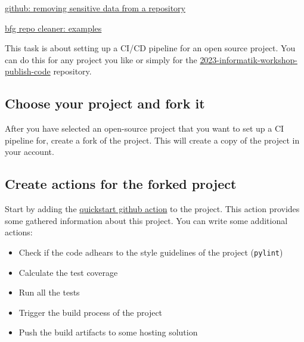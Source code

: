 \documentclass[paper=a4]{scrartcl}
\begin{document}

	\begin{literature} %
  		\item \href{https://docs.github.com/en/authentication/keeping-your-account-and-data-secure/removing-sensitive-data-from-a-repository}{github: removing sensitive data from a repository}
  		\item \href{https://rtyley.github.io/bfg-repo-cleaner/}{bfg repo cleaner: examples}
	\end{literature}

	This task is about setting up a CI/CD pipeline for an open source project. You can do this for any project you like or simply for the \href{https://github.com/marc-philipp-knechtle/2023-informatik-workshop-publish-code}{2023-informatik-workshop-publish-code} repository.
	\subsection*{Choose your project and fork it}
		After you have selected an open-source project that you want to set up a CI pipeline for, create a fork of the project. This will create a copy of the project in your account.

	\subsection*{Create actions for the forked project}
		Start by adding the \href{https://docs.github.com/en/actions/quickstart}{quickstart github action} to the project. This action provides some gathered information about this project.
		\newline
		You can write some additional actions:
		\begin{itemize}
			\item	Check if the code adhears to the style guidelines of the project (\texttt{pylint})
			\item 	Calculate the test coverage
			\item 	Run all the tests
			\item 	Trigger the build process of the project
			\item 	Push the build artifacts to some hosting solution
		\end{itemize}
	
\end{document}
